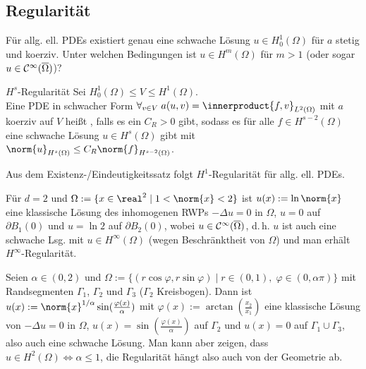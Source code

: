 \subsection{%
    Regularität%
}

\begin{Bem}
    Für allg. ell. PDEs existiert genau eine schwache Lösung $u \in H^1_0(\Omega)$ für
    $a$ stetig und koerziv.
    Unter welchen Bedingungen ist $u \in H^m(\Omega)$ für $m > 1$
    (oder sogar $u \in \mathcal{C}^\infty(\overline{\Omega})$)?
\end{Bem}

\begin{Def}{$H^s$-Regularität}
    Sei $H^1_0(\Omega) \le V \le H^1(\Omega)$.\\
    Eine PDE in schwacher Form $\forall_{v \in V}\; a(u, v) = \innerproduct{f, v}_{L^2(\Omega)}$ mit
    $a$ koerziv auf $V$ heißt , falls es ein $C_R > 0$ gibt, sodass
    es für alle $f \in H^{s-2}(\Omega)$ eine schwache Lösung $u \in H^s(\Omega)$ gibt mit
    $\norm{u}_{H^s(\Omega)} \le C_R \norm{f}_{H^{s-2}(\Omega)}$.
\end{Def}

\begin{Bem}
    Aus dem Existenz-/Eindeutigkeitssatz folgt $H^1$-Regularität für allg. ell. PDEs.
\end{Bem}

\linie

\begin{Bsp}
    Für $d = 2$ und $\Omega := \{x \in \real^2 \;|\; 1 < \norm{x} < 2\}$
    ist $u(x) := \ln \norm{x}$ eine klassische Lösung des inhomogenen RWPs
    $-\Delta u = 0$ in $\Omega$,
    $u = 0$ auf $\partial B_1(0)$ und
    $u = \ln 2$ auf $\partial B_2(0)$, wobei $u \in \mathcal{C}^\infty(\overline{\Omega})$,
    d.\,h. $u$ ist auch eine schwache Lsg. mit $u \in H^\infty(\Omega)$
    (wegen Beschränktheit von $\Omega$)
    und man erhält $H^\infty$-Regularität.
\end{Bsp}

\begin{Bsp}
    Seien $\alpha \in (0, 2)$ und
    $\Omega := \{(r\cos\varphi, r\sin\varphi) \;|\; r \in (0, 1),\; \varphi \in (0, \alpha\pi)\}$
    mit Randsegmenten $\Gamma_1$, $\Gamma_2$ und $\Gamma_3$ ($\Gamma_2$ Kreisbogen).
    Dann ist $u(x) := \norm{x}^{1/\alpha} \sin(\frac{\varphi(x)}{\alpha})$ mit
    $\varphi(x) := \arctan(\frac{x_2}{x_1})$ eine klassische Lösung von
    $-\Delta u = 0$ in $\Omega$,
    $u(x) = \sin(\frac{\varphi(x)}{\alpha})$ auf $\Gamma_2$ und
    $u(x) = 0$ auf $\Gamma_1 \cup \Gamma_3$,
    also auch eine schwache Lösung.
    Man kann aber zeigen, dass $u \in H^2(\Omega) \iff \alpha \le 1$,
    die Regularität hängt also auch von der Geometrie ab.
\end{Bsp}

